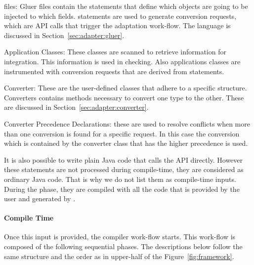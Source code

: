 \begin{description}
\item{\gluer files}: Gluer files contain the \gluer statements that define which objects are going to be injected to which fields. \gluer statements are used to generate conversion requests, which are \zamk API calls that trigger the \zamk adaptation work-flow. The \gluer language is discussed in Section~\ref{sec:adapter:gluer}. 
\item{Application Classes}: These classes are scanned to retrieve information for integration. This information is used in checking. Also applications classes are instrumented with conversion requests that are derived from \gluer statements. 
\item{Converter}: These are the user-defined classes that adhere to a specific structure. Converters contains methods necessary to convert one type to the other. These are discussed in Section~\ref{sec:adapter:converter}.
\item{Converter Precedence Declarations}: these are used to resolve conflicts when more than one conversion is found for a specific request. In this case the conversion which is contained by the converter class that has the higher precedence is used. 
\end{description}

It is also possible to write plain Java code that calls the \zamk API directly.
However these statements are not processed during compile-time, they are considered as ordinary Java code. 
That is why we do not list them as compile-time inputs. 
During the  phase, they are compiled with all the code that is provided by the user and generated by \zamk.

\paragraph{Compile Time}
Once this input is provided, the \zamk compiler work-flow starts. This work-flow is composed of the following sequential phases. The descriptions below follow the same structure and the order as in upper-half of the Figure~\ref{fig:framework}. 


